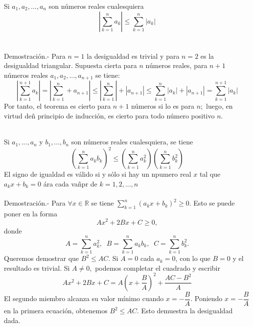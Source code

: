 \begin{teo}
Si $a_1, a_2, ..., a_n$ son números reales cualesquiera $$\left|\displaystyle\sum_{k=1}^n a_k\right| \leq \sum_{k=1}^n |a_k|$$\\\\
Demostración.- \; Para $n=1$ la desigualdad es trivial y para $n=2$ es la desigualdad triangular. Supuesta cierta para $n$ números reales, para $n+1$ números reales $a_1,a_2,...,a_{n+1}$ se tiene:
$$\left| \sum\limits_{k=1}^{n+1} a_k \right|= \left| \sum\limits_{k=1}^n + a_{n+1}\right| \leq \left| \sum\limits_{k=1}^n  \right| + |a_{n+1}| \leq \sum\limits_{k=1}^n |a_k| + |a_{n+1}| = \sum\limits_{k=1}^{n+1} |a_k|$$
Por tanto, el teorema es cierto para $n+1$ números si lo es para $n;$ luego, en virtud deñ principio de inducción, es cierto para todo número positivo $n.$\\\\
\end{teo}

\begin{teo}
Si $a_1,...,a_n$ y $b_1,...,b_n$ son números reales cualesquiera, se tiene
$$\left( \displaystyle\sum_{k=1}^n a_k b_k \right)^2 \leq \left( \sum_{k=1}^n a_k^2 \right) \left( \sum_{k=1}^n b_k^2 \right)$$
El signo de igualdad es válido si y sólo si hay un npumero real $x$ tal que $a_k x + b_k = 0$ ára cada vañpr de $k=1,2,...,n$\\\\
Demostración.- \; Para $\forall x \in \mathbb{R}$ se tiene $\sum\limits_{k=1}^n (a_kx + b_k)^2 \geq 0$. Esto se puede poner en la forma $$Ax^2 + 2Bx + C \geq 0,$$ donde $$A=\sum\limits_{k=1}^n a_k^2 , \; \; B=\sum\limits_{k=1}^n a_k b_k, \; \; C = \sum\limits_{k=1}^n b_k^2.$$ Queremos demostrar que $B^2 \leq AC.$ Si $A=0$ cada $a_k=0$, con lo que $B=0$ y el resultado es trivial. Si $A \neq 0,$ podemos completar el cuadrado y escribir $$Ax^2 + 2Bx + C = A \left( x + \dfrac{B}{A} \right)^2 + \dfrac{AC - B^2}{A}$$
El segundo miembro alcanza su valor mínimo cuando $x=-\dfrac{B}{A}$. Poniendo $x=- \dfrac{B}{A}$ en la primera ecuación, obtenemos $B^2 \leq AC.$ Esto demuestra la desigualdad dada.\\\\
\end{teo}

